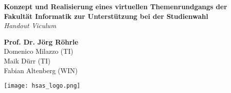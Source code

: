 \documentclass[a0,portrait]{a0poster}
\begin{document}


\begin{minipage}[b]{0.90\linewidth}
\begin{singlespace}
\veryHuge \color{NavyBlue} \textbf{Konzept und Realisierung eines virtuellen Themenrundgangs der Fakultät Informatik zur Unterstützung bei der Studienwahl} \color{Black}\\ %
\Huge\textit{Handout Viculum}\\[2cm] %
\end{singlespace}
\end{minipage}

\begin{minipage}[b]{0.55\linewidth}
\begin{singlespace}
\huge \textbf{Prof. Dr. Jörg Röhrle}\\[0.5cm] 
\huge Domenico Milazzo (TI)\\[0.3cm] 
\huge Maik Dürr (TI)\\[0.3cm] 
\huge Fabian Altenberg (WIN)\\[0.3cm] 
\end{singlespace} 
\end{minipage}
%
\begin{minipage}[b]{0.25\linewidth}
\texttt{[image: hsas\_logo.png]}\\
\end{minipage}
%



\end{document}
